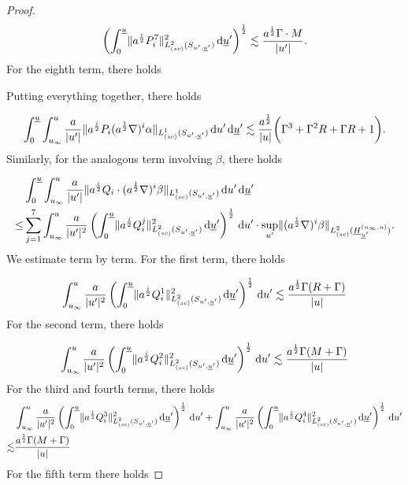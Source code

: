 \documentclass{amsart}
\newcommand{\aln}{(\al \nabla)^i}
\newcommand{\ali}{a^{\frac{i}{2}}}
\newcommand{\dubarprime}{\hspace{.5mm} \text{d} \ubar^{\prime}}
\newcommand{\intu}{\int_{u_{\infty}}^u}
\newcommand{\intubar}{\int_0^{\ubar}}
\newcommand{\upr}{\lvert u^\prime \rvert}
\newcommand{\al}{a^{\frac{1}{2}}}
\newcommand{\ubar}{\underline{u}}
\newcommand{\scaleoneSuprimeubarprime}[1]{\lVert{#1} \rVert_{L^1_{(sc)}(S_{u^\prime,\ubar^\prime})}}
\newcommand{\scaletwoSuprimeubarprime}[1]{\lVert{#1} \rVert_{L^2_{(sc)}(S_{u^\prime,\ubar^\prime})}}
\newcommand{\duprime}{\hspace{.5mm} \text{d}u^{\prime}}
\def\Hb {\underline{H}}
\begin{document}
{\begin{proof}
\[ \left( \intubar \scaletwoSuprimeubarprime{\ali P_i^7}^2 \dubarprime \right)^{\frac{1}{2}}\lesssim \frac{\al \Gamma \cdot M}{\upr}.\] For the eighth term, there holds


\noindent Putting everything together, there holds

\begin{equation} \label{alphabeta1} \intubar \intu \frac{a}{\upr} \scaleoneSuprimeubarprime{\ali P_i \aln \alpha} \duprime \dubarprime\lesssim \frac{a^{\frac{1}{2}}}{|u|}\bigg(\Gamma^3 + \Gamma^2 R + \Gamma R+1\bigg).\end{equation}
Similarly, for the analogous term involving $\beta$, there holds

\begin{equation}
    \begin{split}
         &\intubar \intu  \frac{a}{\upr} \scaleoneSuprimeubarprime{\ali Q_i \cdot \aln \beta }  \duprime \dubarprime \\\leq&\sum_{j=1}^{7} \intu \frac{a}{\upr^2} \left(  \intubar \scaletwoSuprimeubarprime{\ali Q_i^j }^2\dubarprime \right)^{\frac{1}{2}}\duprime
        \cdot \sup_{u^{\prime}} \lVert \aln \beta \rVert_{L^2_{(sc)}(\Hb_{\ubar^{\prime}}^{(u_{\infty},u)})}.
    \end{split}
\end{equation}We estimate term by term. For the first term, there holds

\begin{equation}
    \intu \frac{a}{\upr^2}\left( \intubar \scaletwoSuprimeubarprime{\ali Q_i^1}^2 \dubarprime \right)^{\frac{1}{2}} \duprime \lesssim \frac{a^{\frac{1}{2}}\Gamma (R+\Gamma)}{\lvert u \rvert }
\end{equation}
For the second term, there holds

\begin{equation}
    \intu \frac{a}{\upr^2}\left( \intubar \scaletwoSuprimeubarprime{\ali Q_i^2}^2 \dubarprime \right)^{\frac{1}{2}} \duprime \lesssim \frac{a^{\frac{1}{2}}\Gamma (M+\Gamma)}{\lvert u \rvert }
\end{equation}For the third and fourth terms, there holds 
\begin{equation}
\begin{split}
    &\intu \frac{a}{\upr^2}\left( \intubar \scaletwoSuprimeubarprime{\ali Q_i^3}^2 \dubarprime \right)^{\frac{1}{2}} \duprime +    \intu \frac{a}{\upr^2}\left( \intubar \scaletwoSuprimeubarprime{\ali Q_i^4}^2 \dubarprime \right)^{\frac{1}{2}} \duprime  \\\lesssim& \frac{a^{\frac{1}{2}}\Gamma (M+\Gamma)}{\lvert u \rvert }
    \end{split}
\end{equation}
For the fifth term there holds 


\end{proof}}
\end{document}
